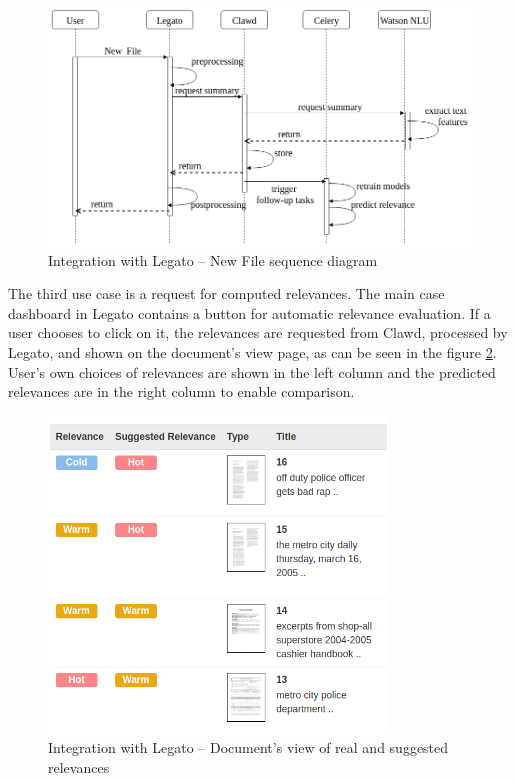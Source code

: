 \documentclass[
  digital, %
  notable,   %
  nolof,     %
  nolot,     %
]{fithesis3}
\begin{document}
\begin{figure}[h]
\caption{Integration with Legato -- New File sequence diagram}
\label{fig:integration_new_file}
\includegraphics[width=\textwidth]{img/integration_new_file}
\end{figure}

The third use case is a request for computed relevances.
The main case dashboard in Legato contains a button for automatic relevance evaluation.
If a user chooses to click on it, the relevances are requested from Clawd, processed by Legato, and shown on the document's view page, as can be seen in the figure \ref{fig:integration_documentsview}.
User's own choices of relevances are shown in the left column and the predicted relevances are in the right column to enable comparison.

\begin{figure}[h]
\caption{Integration with Legato -- Document's view of real and suggested relevances}
\label{fig:integration_documentsview}
\includegraphics[width=0.8\textwidth]{img/integration_documentsview}
\end{figure}
\end{document}
